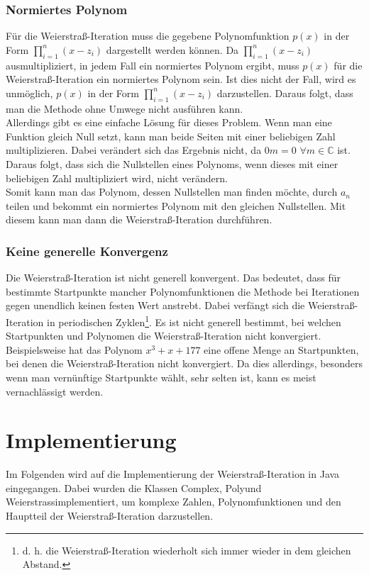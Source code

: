 \documentclass[12pt]{article}
\begin{document}
\subsubsection{Normiertes Polynom}
Für die Weierstraß-Iteration muss die gegebene Polynomfunktion $p(x)$ in der Form $\prod_{i=1}^n (x-z_i)$ dargestellt werden können. Da $\prod_{i=1}^n (x-z_i)$ ausmultipliziert, in jedem Fall ein normiertes Polynom ergibt, muss $p(x)$ für die Weierstraß-Iteration ein normiertes Polynom sein.
Ist dies nicht der Fall, wird es unmöglich, $p(x)$ in der Form $\prod_{i=1}^n (x-z_i)$ darzustellen. Daraus folgt, dass man die Methode ohne Umwege nicht ausführen kann. \\
Allerdings gibt es eine einfache Lösung für dieses Problem. Wenn man eine Funktion gleich Null setzt, kann man beide Seiten mit einer beliebigen Zahl multiplizieren. Dabei verändert sich das Ergebnis nicht, da $0m = 0$ \space $\forall m \in \mathbb{C}$ ist. Daraus folgt, dass sich die Nullstellen eines Polynoms, wenn dieses mit einer beliebigen Zahl multipliziert wird, nicht verändern. \\
Somit kann man das Polynom, dessen Nullstellen man finden möchte, durch $a_n$ teilen und bekommt ein normiertes Polynom mit den gleichen Nullstellen. Mit diesem kann man dann die Weierstraß-Iteration durchführen.

\subsubsection{Keine generelle Konvergenz}
Die Weierstraß-Iteration ist nicht generell konvergent. Das bedeutet, dass für bestimmte Startpunkte mancher Polynomfunktionen die Methode bei Iterationen gegen unendlich keinen festen Wert anstrebt. Dabei verfängt sich die Weierstraß-Iteration in periodischen Zyklen\footnote{d. h. die Weierstraß-Iteration wiederholt sich immer wieder in dem gleichen Abstand.}. Es ist nicht generell bestimmt, bei welchen Startpunkten und Polynomen die Weierstraß-Iteration nicht konvergiert. Beispielsweise hat das Polynom $x^3+x+177$ eine offene Menge an Startpunkten, bei denen die Weierstraß-Iteration nicht konvergiert. Da dies allerdings, besonders wenn man vernünftige Startpunkte wählt, sehr selten ist, kann es meist vernachlässigt werden. 



\section{Implementierung}
Im Folgenden wird auf die Implementierung der Weierstraß-Iteration in Java eingegangen. Dabei wurden die Klassen \glqq Complex\grqq, \glqq Poly\grqq\space und \glqq Weierstrass\grqq\space implementiert, um komplexe Zahlen, Polynomfunktionen und den Hauptteil der Weierstraß-Iteration darzustellen.
\end{document}
